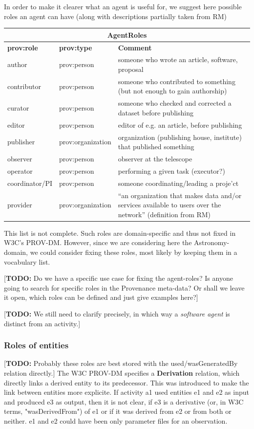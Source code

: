 \documentclass[11pt,a4paper]{ivoa}
\newcommand{\TODO}[1]{\noindent \textcolor{todocolor}{[\textbf{TODO:} #1]}}
\begin{document}
In order to make it clearer what an agent is useful for, we suggest here possible roles an agent can have (along with descriptions partially taken from RM)\\
\begin{center}
\begin{tabular}{l|l|p{}}
\multicolumn{3}{c}{\textbf{AgentRoles}}\\ \hline
\textbf{prov:role} & \textbf{prov:type} & \textbf{Comment} \\ \hline
author & prov:person & someone who wrote an article, software, proposal\\
contributor & prov:person & someone who contributed to something (but not enough to gain authorship)\\
curator & prov:person & someone who checked and corrected a dataset before publishing\\
editor & prov:person & editor of e.g. an article, before publishing\\
publisher & prov:organization & organization (publishing house, institute) that published something\\
observer & prov:person & observer at the telescope\\
operator & prov:person & performing a given task (executor?)\\
coordinator/PI & prov:person & someone coordinating/leading a proje'ct\\
provider & prov:organization & ``an organization that makes data and/or services available to users over the network'' (definition from RM)
\end{tabular}
\end{center}
This list is not complete. Such roles are domain-specific and thus not fixed in W3C's PROV-DM. However, since we are considering here the Astronomy-domain, we could 
consider fixing these roles, most likely by keeping them in a vocabulary list.

\TODO{Do we have a specific use case for fixing the agent-roles? Is anyone going to search for specific roles in the Provenance meta-data?
Or shall we leave it open, which roles can be defined and just give examples here?}

\TODO{We still need to clarify precisely, in which way a \emph{software agent} is distinct from an activity.}


\subsubsection{Roles of entities}
\TODO{Probably these roles are best stored with the used/wasGeneratedBy relation directly.}
The W3C PROV-DM specifies a \textbf{Derivation} relation, which directly links a derived entity to its predecessor. This was introduced to make the link between entities more explicite. If activity a1 used entities e1 and e2 as input and produced e3 as output, then it is not clear, if e3 is a derivative (or, in W3C terms, "wasDerivedFrom") of e1 or if it was derived from e2 or from both or neither. e1 and e2 could have been only parameter files for an observation.  
\end{document}
